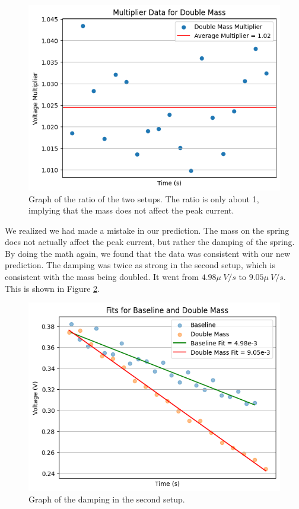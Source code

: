 \documentclass[11pt]{article}
\begin{document}
    \begin{figure}[H]
        \centering
        \includegraphics[width=0.8\linewidth]{resources/images/part1b ratios}
        \caption{Graph of the ratio of the two setups. The ratio is only about 1, implying that the mass does not affect the peak current.}
        \label{fig:part1b_ratios}
    \end{figure}

    We realized we had made a mistake in our prediction.
    The mass on the spring does not actually affect the peak current, but rather the damping of the spring.
    By doing the math again, we found that the data was consistent with our new prediction.
    The damping was twice as strong in the second setup, which is consistent with the mass being doubled.
    It went from $4.98 \mu~V/s $ to $9.05 \mu~V/s$.
    This is shown in Figure \ref{fig:part1b_fits}.

    \begin{figure}[H]
        \centering
        \includegraphics[width=0.8\linewidth]{resources/images/part1b fits}
        \caption{Graph of the damping in the second setup.}
        \label{fig:part1b_fits}
    \end{figure}
\end{document}
